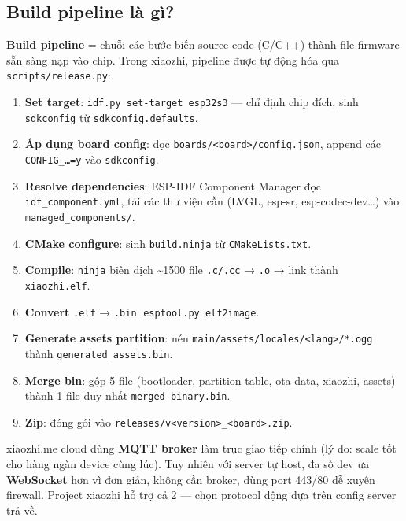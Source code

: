 \documentclass[11pt,a4paper]{article}
\begin{document}
\subsection{Build pipeline là gì?}
\textbf{Build pipeline} = chuỗi các bước biến source code (C/C++) thành file firmware sẵn sàng nạp vào chip. Trong xiaozhi, pipeline được tự động hóa qua \texttt{scripts/release.py}:

\begin{enumerate}
  \item \textbf{Set target}: \texttt{idf.py set-target esp32s3} — chỉ định chip đích, sinh \texttt{sdkconfig} từ \texttt{sdkconfig.defaults}.
  \item \textbf{Áp dụng board config}: đọc \texttt{boards/<board>/config.json}, append các \texttt{CONFIG\_\ldots=y} vào \texttt{sdkconfig}.
  \item \textbf{Resolve dependencies}: ESP-IDF Component Manager đọc \texttt{idf\_component.yml}, tải các thư viện cần (LVGL, esp-sr, esp-codec-dev\ldots) vào \texttt{managed\_components/}.
  \item \textbf{CMake configure}: sinh \texttt{build.ninja} từ \texttt{CMakeLists.txt}.
  \item \textbf{Compile}: \texttt{ninja} biên dịch \textasciitilde 1500 file \texttt{.c/.cc} → \texttt{.o} → link thành \texttt{xiaozhi.elf}.
  \item \textbf{Convert} \texttt{.elf} → \texttt{.bin}: \texttt{esptool.py elf2image}.
  \item \textbf{Generate assets partition}: nén \texttt{main/assets/locales/<lang>/*.ogg} thành \texttt{generated\_assets.bin}.
  \item \textbf{Merge bin}: gộp 5 file (bootloader, partition table, ota data, xiaozhi, assets) thành 1 file duy nhất \texttt{merged-binary.bin}.
  \item \textbf{Zip}: đóng gói vào \texttt{releases/v<version>\_<board>.zip}.
\end{enumerate}

\begin{tcolorbox}[notebox,title={Tại sao có 2 protocol song song (MQTT \& WebSocket)?}]
xiaozhi.me cloud dùng \textbf{MQTT broker} làm trục giao tiếp chính (lý do: scale tốt cho hàng ngàn device cùng lúc). Tuy nhiên với server tự host, đa số dev ưa \textbf{WebSocket} hơn vì đơn giản, không cần broker, dùng port 443/80 dễ xuyên firewall. Project xiaozhi hỗ trợ cả 2 — chọn protocol động dựa trên config server trả về.
\end{tcolorbox}
\end{document}
